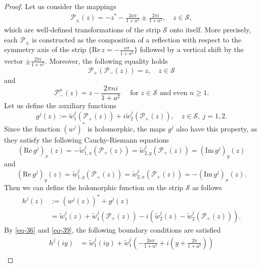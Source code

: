 \documentclass[10pt,a4paper]{amsart}
\def\PP{\mathcal{P}}
\def\SS{\mathcal{S}}
\begin{document}
\begin{proof}
Let us consider the mappings 
\begin{align*}
\PP_{\pm}(z) = -z^{*} - \frac{2a\pi}{1+a^2} \pm \frac{2\pi i}{1+a^2}, \quad z\in\SS, 
\end{align*}
which are well-defined transformations of the strip $\SS$ onto itself. More precisely, each $\PP_{\pm}$ is constructed as the composition of a reflection with respect to the symmetry axis of the strip $\{\mathrm{Re}\,z = - \tfrac{a\pi}{1+a^2}\}$ followed by a vertical shift by the vector $\pm\tfrac{2\pi i}{1+a^2}$. Moreover, the following equality holds 
\begin{equation}\label{eq-p1}
\PP_{+}(\PP_{-}(z)) = z, \quad z\in\SS
\end{equation}
and 
\begin{equation}\label{eq-p2}
\PP_{-}^{n}(z) = z - \frac{2\pi n i}{1+a^2} \quad \text{ for } z\in\SS\text{ and even } n\ge 1.
\end{equation}
Let us define the auxiliary functions $$g^j(z) := \tilde{w}_{1}^j(\PP_{+}(z)) + i\tilde{w}_{2}^j(\PP_{+}(z)), \quad z\in\SS, \ j=1,2.$$ 
Since the function $(w^{j})^{*}$ is holomorphic, the maps $g^j$ also have this property, as they satisfy the following Cauchy-Riemann equations 
\begin{equation*}
(\mathrm{Re}\, g^{j})_{x}(z) = -\tilde{w}_{1,x}^j(\PP_{+}(z)) = \tilde{w}_{2,y}^j(\PP_{+}(z)) = (\mathrm{Im}\, g^{j})_{y}(z)
\end{equation*}
and
\begin{equation*}
(\mathrm{Re}\, g^{j})_{y}(z) = \tilde{w}_{1,y}^j(\PP_{+}(z)) = \tilde{w}_{2,x}^j(\PP_{+}(z)) = -(\mathrm{Im}\, g^{j})_{x}(z).
\end{equation*}
Then we can define the holomorphic function on the strip $\SS$ as follows
\begin{equation*}
\begin{aligned}
h^j(z) & := (w^j(z))^{*} + g^j(z) \\
& = \tilde{w}_{1}^j(z) + \tilde{w}_{1}^j(\PP_{+}(z)) - i \left(\tilde{w}_{2}^j(z) - \tilde{w}_{2}^j(\PP_{+}(z))\right).
\end{aligned}
\end{equation*}
By \eqref{eq-36} and \eqref{eq-39}, the following boundary conditions are satisfied 
\begin{equation}
\begin{aligned}\label{eq-50}
h^j(iy) &= \tilde{w}_{1}^j(iy) + \tilde{w}_{1}^j\left(-\frac{2a\pi}{1+a^2}+ i\left(y + \frac{2\pi}{1+a^2}\right)\right) \\

\end{aligned}
\end{equation}
\end{proof}
\end{document}
